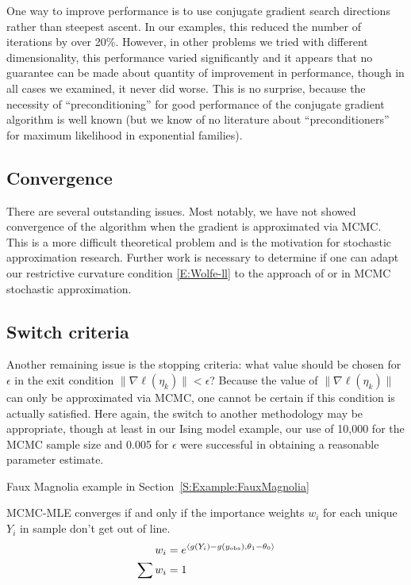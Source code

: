 One way to improve performance is to use conjugate gradient search directions rather 
than steepest ascent.  In our 
examples, this reduced the number of iterations by over 20\%.  However, in other 
problems we tried with different 
dimensionality, this performance varied significantly and it appears that no guarantee 
can be made about quantity of 
improvement in performance, though in all cases we examined, it never did worse.  This 
is no surprise, because the
necessity of ``preconditioning'' for good performance of the conjugate gradient 
algorithm is well known (but 
we know of no literature about ``preconditioners'' for 
maximum likelihood in exponential families).

\subsection{Convergence}
There are several outstanding issues.  Most notably, we have not showed convergence of 
the algorithm when the gradient 
is approximated via MCMC.  This is a more difficult theoretical problem and is the 
motivation for stochastic 
approximation research.  
Further work is necessary to determine if one can adapt our restrictive curvature 
condition \eqref{E:Wolfe-ll} to the 
approach of \citet{Andrieu:2005} or \citet{Liang:2010} in MCMC stochastic 
approximation.  

\subsection{Switch criteria}
Another remaining issue is the stopping criteria: what value should be chosen for $
\epsilon$ in the exit condition
$\lVert  \nabla \ell( \eta_k ) \rVert < \epsilon$?  Because the value of $\lVert  
\nabla \ell( \eta_k ) \rVert$ can only 
be approximated via MCMC, one cannot be certain if this condition is actually 
satisfied.  Here again, the switch to 
another methodology may be appropriate, though at least in our Ising model example, 
our use of 10,000 for the MCMC 
sample size and 0.005 for $\epsilon$ were successful in obtaining a reasonable 
parameter estimate. 

Faux Magnolia example in Section~\ref{S:Example:FauxMagnolia}

MCMC-MLE converges if and only if the importance weights $w_i$ 
for each unique $Y_i$ in sample don't get out of line.
\begin{align*}
	w_i &= e^{\langle g(Y_i) - g(y_{\text{obs}}), \theta_1 - \theta_0 \rangle}\\
	\sum w_i &= 1\\
\end{align*}


